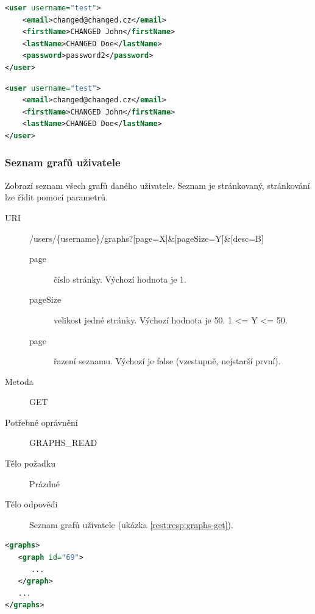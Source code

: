 \documentclass[thesis=M,czech]{FITthesis}[2014/05/6]
\begin{document}
\begin{lstlisting}[caption=Tělo požadavku zdroje /users/\{username\} (PUT), label=rest:req:user-put, language=xml]
<user username="test">
    <email>changed@changed.cz</email>
    <firstName>CHANGED John</firstName>
    <lastName>CHANGED Doe</lastName>
    <password>password2</password>
</user>
\end{lstlisting}  

\begin{lstlisting}[caption=Tělo odpovědi zdroje /users/\{username\} (PUT), label=rest:resp:user-put, language=xml]
<user username="test">   
    <email>changed@changed.cz</email>
    <firstName>CHANGED John</firstName>
    <lastName>CHANGED Doe</lastName>
</user>
\end{lstlisting}

\subsubsection{Seznam grafů uživatele}
Zobrazí seznam všech grafů daného uživatele. Seznam je stránkovaný, stránkování lze řídit pomocí parametrů.
\begin{description}
  \item[URI] /users/\{username\}/graphs?[page=X]\&[pageSize=Y]\&[desc=B]
  \begin{description}
     \item[page] číslo stránky. Výchozí hodnota je 1.
     \item[pageSize] velikost jedné stránky. Výchozí hodnota je 50. 1 <= Y <= 50.
     \item[page] řazení seznamu. Výchozí je false (vzestupně, nejstarší první).
  \end{description}	
  \item[Metoda] GET
  \item[Potřebné oprávnění] GRAPHS\_READ
  \item[Tělo požadku] Prázdné
  \item[Tělo odpovědi] Seznam grafů uživatele (ukázka \ref{rest:resp:graphs-get}).
\end{description}

\begin{lstlisting}[caption=Tělo odpovědi zdroje /users/\{username\}/graphs (GET), label=rest:resp:graphs-get, language=xml]
<graphs>
   <graph id="69">
      ...
   </graph>
   ...
</graphs>
\end{lstlisting}  
\end{document}

